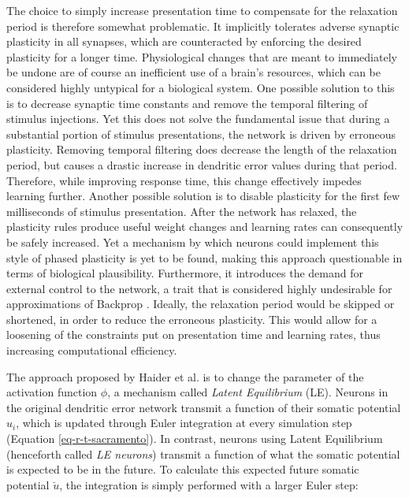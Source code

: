 The choice to simply increase presentation time to compensate for the relaxation period is therefore somewhat
problematic. It implicitly tolerates adverse synaptic plasticity in all synapses, which are counteracted by enforcing
the desired plasticity for a longer time. Physiological changes that are meant to immediately be undone are of course an
inefficient use of a brain's resources, which can be considered highly untypical for a biological system. One possible
solution to this is to decrease synaptic time constants and remove the temporal filtering of stimulus injections. Yet
this does not solve the fundamental issue that during a substantial portion of stimulus presentations, the network is
driven by erroneous plasticity. Removing temporal filtering does decrease the length of the relaxation period, but
causes a drastic increase in dendritic error values during that period. Therefore, while improving response time, this
change effectively impedes learning further. Another possible solution is to disable plasticity for the first few milliseconds
of stimulus presentation. After the network has relaxed, the plasticity rules produce useful weight changes and learning
rates can consequently be safely increased. Yet a mechanism by which neurons could implement this style of phased
plasticity is yet to be found, making this approach questionable in terms of biological plausibility. Furthermore, it
introduces the demand for external control to the network, a trait that is considered highly undesirable for
approximations of Backprop \citep{whittington2019theories}. Ideally, the relaxation period would be skipped or
shortened, in order to reduce the erroneous plasticity. This would allow for a loosening of the constraints put on
presentation time and learning rates, thus increasing computational efficiency. \newline



The approach proposed by Haider et al. is to change the parameter of the activation function $\phi$, a mechanism called
\textit{Latent Equilibrium} (LE). Neurons in the original dendritic error network transmit a function of their somatic
potential $u_i$, which is updated through Euler integration at every simulation step (Equation \ref{eq-r-t-sacramento}).
In contrast, neurons using Latent Equilibrium (henceforth called \textit{LE neurons}) transmit a function of what the
somatic potential is expected to be in the future. To calculate this expected future somatic potential $\breve{u}$, the
integration is simply performed with a larger Euler step:

